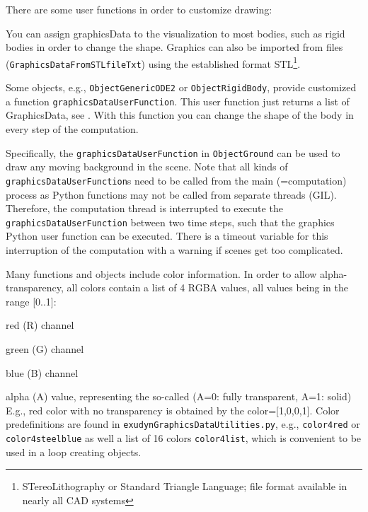 There are some user functions in order to customize drawing:
\bi
  \item You can assign graphicsData to the visualization to most bodies, such as rigid bodies in order to change the shape. Graphics can also be imported from files (\texttt{GraphicsDataFromSTLfileTxt}) using the established format \ac{STL}\footnote{STereoLithography or Standard Triangle Language; file format available in nearly all CAD systems}.
  \item Some objects, e.g., \texttt{ObjectGenericODE2} or \texttt{ObjectRigidBody}, provide customized a function \texttt{graphicsDataUserFunction}. This user function just returns a list of GraphicsData, see . With this function you can change the shape of the body in every step of the computation.
  \item Specifically, the \texttt{graphicsDataUserFunction} in \texttt{ObjectGround} can be used to draw any moving background in the scene.
\ei
Note that all kinds of \texttt{graphicsDataUserFunction}s need to be called from the main (=computation) process as Python functions may not be called from separate threads (GIL). Therefore, the computation thread is interrupted to execute the \texttt{graphicsDataUserFunction} between two time steps, such that the graphics Python user function can be executed. There is a timeout variable for this interruption of the computation with a warning if scenes get too complicated.

Many functions and objects include color information. In order to allow alpha-transparency, all colors contain a list of 4 RGBA values, all values being in the range [0..1]:
\bi
  \item red (R) channel 
  \item green (G) channel  
  \item blue (B) channel 
  \item alpha (A) value, representing the so-called  (A=0: fully transparent, A=1: solid)
\ei
E.g., red color with no transparency is obtained by the color=[1,0,0,1]. Color predefinitions are found in \texttt{exudynGraphicsDataUtilities.py}, e.g., \texttt{color4red} or \texttt{color4steelblue} as well a list of 16 colors \texttt{color4list}, which is convenient to be used in a loop creating objects.

